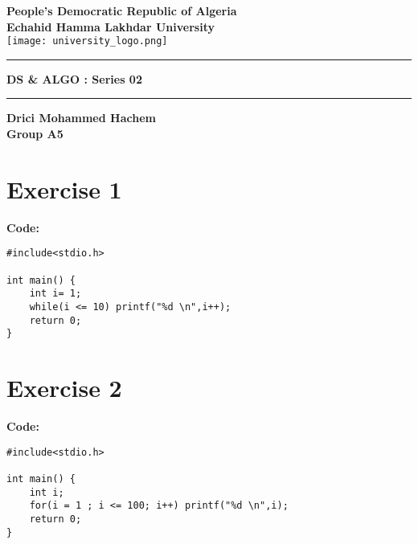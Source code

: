 \documentclass[12pt]{article}
\begin{document}
	
	\begin{titlepage}
		\centering
		\vspace*{2cm}
		
		\textbf{\Large People's Democratic Republic of Algeria}\\
		\vspace{0.5cm}
		\textbf{\large Echahid Hamma Lakhdar University}\\
		
		\vspace{1cm}
		\texttt{[image: university\_logo.png]} %
		
		\vspace{1.5cm}
		\rule{\textwidth}{1pt}
		\vspace{0.5cm}
		
		\textbf{\Large DS \& ALGO : Series 02}\\
		\vspace{0.5cm}
		\rule{\textwidth}{1pt}
		\vspace{0.5cm}
		
		\vspace{1.5cm}
		\textbf{\Huge Drici Mohammed Hachem}\\
		\vspace{0.5cm}
		\textbf{\Large Group A5}\\
		
		\vfill
	\end{titlepage}
	
	\newpage
	\section*{Exercise 1}
	\vspace{0.5cm}
	
	\textbf{Code:}
\begin{lstlisting}
#include<stdio.h>

int main() {
    int i= 1;
    while(i <= 10) printf("%d \n",i++); 
    return 0;
}
\end{lstlisting}
	\vspace{1cm}
	
	\section*{Exercise 2}
	\vspace{0.5cm}
	
	\textbf{Code:}
\begin{lstlisting}
#include<stdio.h>

int main() {
    int i;
    for(i = 1 ; i <= 100; i++) printf("%d \n",i);
    return 0;
}
\end{lstlisting}
	\vspace{1cm}
	
\end{document}
